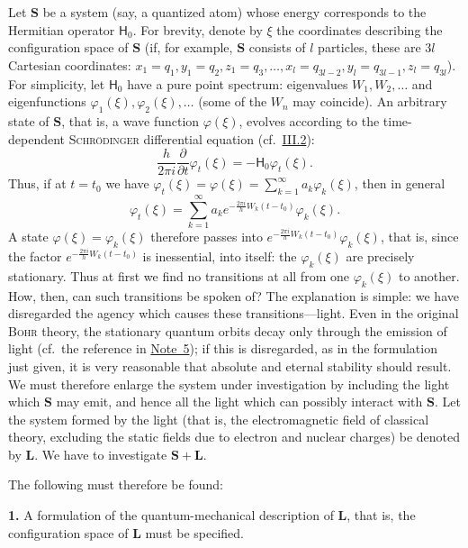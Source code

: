 \documentclass[fontsize=13pt,twoside,openany,headings=normal,parskip=false,bookmarkpackage=false,DIV=calc]{scrbook}
\begin{document}
Let $\boldsymbol{S}$ be a system (say, a quantized atom) whose energy corresponds to the Hermitian operator $\mathsf{H}_0$. For brevity, denote by $\xi$ the coordinates describing the configuration space of $\boldsymbol{S}$ (if, for example, $\boldsymbol{S}$ consists of $l$ particles, these are $3l$ Cartesian coordinates: $x_1=q_1,y_1=q_2,z_1=q_3,\ldots,x_l=q_{3l-2},y_l=q_{3l-1},z_l=q_{3l}$). For simplicity, let $\mathsf{H}_0$ have a pure point spectrum: eigenvalues $W_1,W_2,\ldots$ and eigenfunctions $\varphi_1(\xi),\varphi_2(\xi),\ldots$ (some of the $W_n$ may coincide). An arbitrary state of $\boldsymbol{S}$, that is, a wave function $\varphi(\xi)$, evolves according to the time-dependent \textsc{Schrödinger} differential equation (cf.\ \hyperref[sec:III.2]{III.2}):
\[
 \frac{h}{2\pi i}\frac{\partial}{\partial t}\varphi_t(\xi)=-\mathsf{H}_0\varphi_t(\xi).
\]
Thus, if at $t=t_0$ we have $\varphi_t(\xi)=\varphi(\xi)=\sum_{k=1}^{\infty}a_k\varphi_k(\xi)$, then in general
\[
 \varphi_t(\xi)=\sum_{k=1}^{\infty}a_ke^{-\frac{2\pi i}{h}W_k(t-t_0)}\varphi_k(\xi).
\]
A state $\varphi(\xi)=\varphi_k(\xi)$ therefore passes into $e^{-\frac{2\pi i}{h}W_k(t-t_0)}\varphi_k(\xi)$, that is, since the factor $e^{-\frac{2\pi i}{h}W_k(t-t_0)}$ is inessential, into itself: the $\varphi_k(\xi)$ are precisely stationary. Thus at first we find no transitions at all from one $\varphi_k(\xi)$ to another. How, then, can such transitions be spoken of? The explanation is simple: we have disregarded the agency which causes these transitions---light. Even in the original \textsc{Bohr} theory, the stationary quantum orbits decay only through the emission of light (cf.\ the reference in \hyperlink{note-5}{Note~5}); if this is disregarded, as in the formulation just given, it is very reasonable that absolute and eternal stability should result.
\hypertarget{origpage-136}{}%
We must therefore enlarge the system under investigation by including the light which $\boldsymbol{S}$ may emit, and hence all the light which can possibly interact with $\boldsymbol{S}$. Let the system formed by the light (that is, the electromagnetic field of classical theory, excluding the static fields due to electron and nuclear charges) be denoted by $\boldsymbol{L}$. We have to investigate $\boldsymbol{S}+\boldsymbol{L}$.

The following must therefore be found:

\leavevmode{}\label{problem:III.6.1}\textbf{1.} A formulation of the quantum-mechanical description of $\boldsymbol{L}$, that is, the configuration space of $\boldsymbol{L}$ must be specified.
\end{document}
